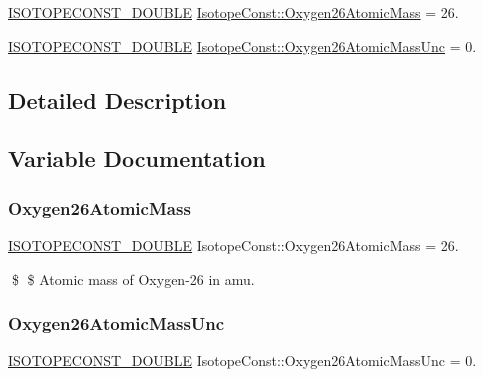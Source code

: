 \begin{DoxyCompactItemize}
\item 
\mbox{\hyperlink{group___isotope_const-_macros_ga8f45a7272ce02c0b4c65c44636ed719a}{I\+S\+O\+T\+O\+P\+E\+C\+O\+N\+S\+T\+\_\+\+D\+O\+U\+B\+LE}} \mbox{\hyperlink{group___isotope_const-_oxygen-_o26_gadbf846acad0ac0c6bcabece2b4986969}{Isotope\+Const\+::\+Oxygen26\+Atomic\+Mass}} = 26.
\item 
\mbox{\hyperlink{group___isotope_const-_macros_ga8f45a7272ce02c0b4c65c44636ed719a}{I\+S\+O\+T\+O\+P\+E\+C\+O\+N\+S\+T\+\_\+\+D\+O\+U\+B\+LE}} \mbox{\hyperlink{group___isotope_const-_oxygen-_o26_ga62eef4dca37c3a2bccd160693801602d}{Isotope\+Const\+::\+Oxygen26\+Atomic\+Mass\+Unc}} = 0.
\end{DoxyCompactItemize}


\subsection{Detailed Description}


\subsection{Variable Documentation}
\mbox{\label{group___isotope_const-_oxygen-_o26_gadbf846acad0ac0c6bcabece2b4986969}} 
\subsubsection{\texorpdfstring{Oxygen26\+Atomic\+Mass}{Oxygen26AtomicMass}}
{\footnotesize\ttfamily \mbox{\hyperlink{group___isotope_const-_macros_ga8f45a7272ce02c0b4c65c44636ed719a}{I\+S\+O\+T\+O\+P\+E\+C\+O\+N\+S\+T\+\_\+\+D\+O\+U\+B\+LE}} Isotope\+Const\+::\+Oxygen26\+Atomic\+Mass = 26.}

\$ \$ Atomic mass of Oxygen-\/26 in amu. \mbox{\label{group___isotope_const-_oxygen-_o26_ga62eef4dca37c3a2bccd160693801602d}} 
\subsubsection{\texorpdfstring{Oxygen26\+Atomic\+Mass\+Unc}{Oxygen26AtomicMassUnc}}
{\footnotesize\ttfamily \mbox{\hyperlink{group___isotope_const-_macros_ga8f45a7272ce02c0b4c65c44636ed719a}{I\+S\+O\+T\+O\+P\+E\+C\+O\+N\+S\+T\+\_\+\+D\+O\+U\+B\+LE}} Isotope\+Const\+::\+Oxygen26\+Atomic\+Mass\+Unc = 0.}

